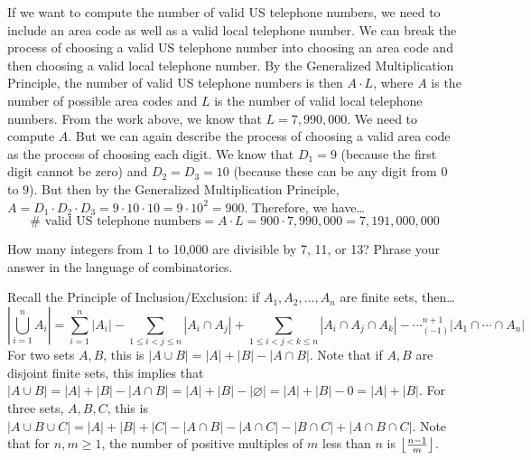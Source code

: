 \documentclass[11pt,letterpaper]{article}
\DeclarePairedDelimiter\floor{\lfloor}{\rfloor}
\begin{document}
If we want to compute the number of valid US telephone numbers, we need to include an area code as well as a valid local telephone number. We can break the process of choosing a valid US telephone number into choosing an area code and then choosing a valid local telephone number. By the Generalized Multiplication Principle, the number of valid US telephone numbers is then $A \cdot L$, where $A$ is the number of possible area codes and $L$ is the number of valid local telephone numbers. From the work above, we know that $L= 7,\!990,\!000$. We need to compute $A$. But we can again describe the process of choosing a valid area code as the process of choosing each digit. We know that $D_1= 9$ (because the first digit cannot be zero) and $D_2= D_3= 10$ (because these can be any digit from $0$ to $9$). But then by the Generalized Multiplication Principle, $A= D_1 \cdot D_2 \cdot D_3= 9 \cdot 10 \cdot 10= 9 \cdot 10^2= 900$. Therefore, we have\dots
	\[
	\# \text{ valid US telephone numbers}= A \cdot L= 900 \cdot 7,\!990,\!000= 7,\!191,\!000,\!000
	\]



\newpage



 How many integers from 1 to 10,000 are divisible by 7, 11, or 13? Phrase your answer in the language of combinatorics. \pspace

\sol Recall the Principle of Inclusion/Exclusion: if $A_1, A_2, \ldots, A_n$ are finite sets, then\dots
	\[
	\left| \bigcup_{i=1}^n A_i \right|= \sum_{i=1}^n |A_i| - \sum_{1 \leq i < j \leq n} |A_i \cap A_j| + \sum_{1 \leq i < j < k \leq n} |A_i \cap A_j \cap A_k| - \cdots _ (-1)^{n+1} |A_1 \cap \cdots \cap A_n|
	\]
For two sets $A, B$, this is $|A \cup B|= |A| + |B| - |A \cap B|$. Note that if $A, B$ are disjoint finite sets, this implies that $|A \cup B|= |A| + |B| - |A \cap B|= |A| + |B| - |\varnothing|= |A| + |B| - 0= |A| + |B|$. For three sets, $A, B, C$, this is $|A \cup B \cup C|= |A| + |B| + |C| - |A \cap B| - |A \cap C| - |B \cap C| + |A \cap B \cap C|$. Note that for $n, m \geq 1$, the number of positive multiples of $m$ less than $n$ is $\floor*{\frac{n - 1}{m}}$. \pspace
\end{document}
